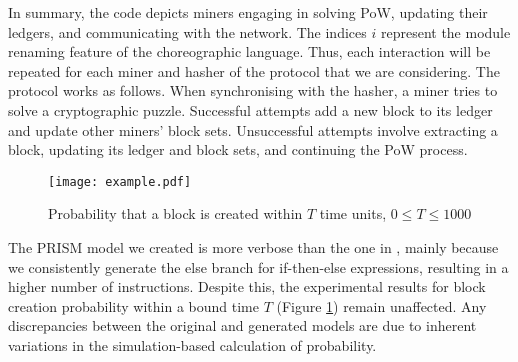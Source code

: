    In summary, the code depicts miners engaging in
   solving PoW, updating their ledgers, and communicating with the
   network.  The indices $i$ represent the module renaming feature of
   the choreographic language. Thus, each interaction will be repeated
   for each miner and hasher of the protocol that we are
   considering. The protocol works as follows. 
   When synchronising with
   the hasher, a miner tries to solve a cryptographic
   puzzle. Successful attempts add a new block to its ledger and update other miners' block sets. Unsuccessful attempts involve extracting a block, updating its ledger and block sets, and continuing the PoW process.

  \begin{figure}[h]
   \centering
   \texttt{[image: example.pdf]}	
   \caption{Probability that a block is created within $T$ time units, $0\leq T\leq 1000$}
   \label{ex3-res}
\end{figure}
The PRISM model we created is more verbose than the one in \cite{DBLP:journals/concurrency/BistarelliNGLMV23}, mainly because we consistently generate the else branch for if-then-else expressions, resulting in a higher number of instructions. Despite this, the experimental results for block creation probability within a bound time $T$ (Figure \ref{ex3-res}) remain unaffected. Any discrepancies between the original and generated models are due to inherent variations in the simulation-based calculation of probability.


